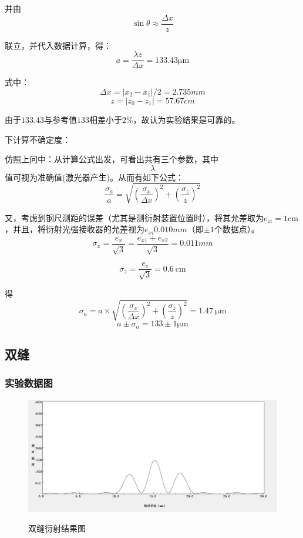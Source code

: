 \documentclass{ctexart}
\begin{document}
并由$$\sin{\theta}\approx \frac{\Delta x}{z}$$

联立，并代入数据计算，得：$$a=\frac{\lambda z}{\Delta x}=133.43\si{\micro \meter}$$

式中：$$\Delta x=|x_2-x_1|/2=2.735\si{mm}$$
$$z=|z_0-z_1|=57.67\si{cm}$$

由于$133.43\mbox{与参考值}133\mbox{相差小于}2\%$，故认为实验结果是可靠的。

下计算不确定度：

仿照上问中：从计算公式出发，可看出共有三个参数，其中$$\lambda$$值可视为准确值(激光器产生)。从而有如下公式：
$$\frac{\sigma_a}a=\sqrt{(\frac{\sigma_x}{\Delta x})^2+(\frac{\sigma_z}z)^2}$$

又，考虑到钢尺测距的误差（尤其是测衍射装置位置时），将其允差取为$e_{zi}=1\si{\centi\meter} $，并且，将衍射光强接收器的允差视为$e_{xi}0.010\si{mm}$（即$\pm 1$个数据点）。
$$\sigma_x=\frac{e_x}{\sqrt{3}}=\frac{e_{x1}+e_{x2}}{\sqrt{3}}=0.011\si{mm}$$

$$\sigma_z=\frac{e_z}{\sqrt{3}}=\SI{0.6}{\centi\meter}$$

得$$\sigma_a=a\times\sqrt{(\frac{\sigma_x}{\Delta x})^2+(\frac{\sigma_z}z)^2}=\SI{1.47}{\micro \meter}  $$ 
$$a \pm \sigma_a=133\pm 1 \si{\micro \meter}$$



\subsection{双缝}

\subsubsection{实验数据图}
\begin{figure}[H]
  \centering
  \caption{双缝衍射结果图}
  \includegraphics[width=\textwidth]{2.jpg}
  \label{fig:digit}
    
\end{figure}
\end{document}
